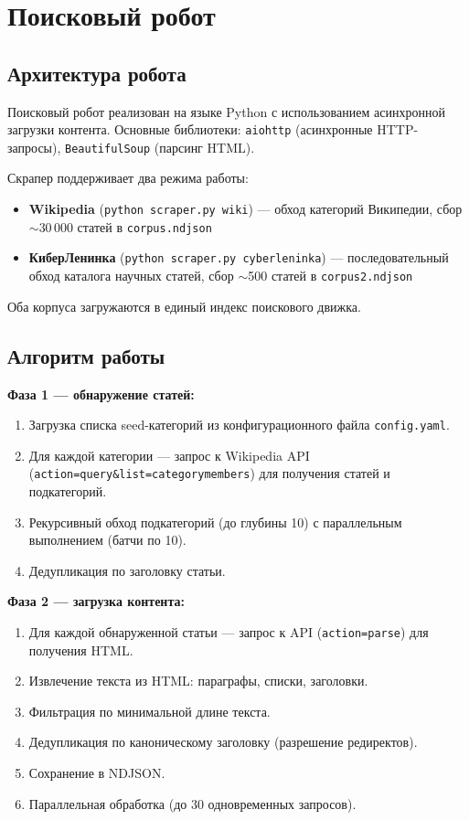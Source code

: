 \section{Поисковый робот}

\subsection{Архитектура робота}

Поисковый робот реализован на языке Python с использованием асинхронной загрузки контента. Основные библиотеки: \texttt{aiohttp} (асинхронные HTTP-запросы), \texttt{BeautifulSoup} (парсинг HTML).

Скрапер поддерживает два режима работы:
\begin{itemize}
    \item \textbf{Wikipedia} (\texttt{python scraper.py wiki}) --- обход категорий Википедии, сбор $\sim$30\,000 статей в \texttt{corpus.ndjson}
    \item \textbf{КиберЛенинка} (\texttt{python scraper.py cyberleninka}) --- последовательный обход каталога научных статей, сбор $\sim$500 статей в \texttt{corpus2.ndjson}
\end{itemize}

Оба корпуса загружаются в единый индекс поискового движка.

\subsection{Алгоритм работы}

\textbf{Фаза 1 --- обнаружение статей:}
\begin{enumerate}
    \item Загрузка списка seed-категорий из конфигурационного файла \texttt{config.yaml}.
    \item Для каждой категории --- запрос к Wikipedia API (\texttt{action=query\&list=categorymembers}) для получения статей и подкатегорий.
    \item Рекурсивный обход подкатегорий (до глубины 10) с параллельным выполнением (батчи по 10).
    \item Дедупликация по заголовку статьи.
\end{enumerate}

\textbf{Фаза 2 --- загрузка контента:}
\begin{enumerate}
    \item Для каждой обнаруженной статьи --- запрос к API (\texttt{action=parse}) для получения HTML.
    \item Извлечение текста из HTML: параграфы, списки, заголовки.
    \item Фильтрация по минимальной длине текста.
    \item Дедупликация по каноническому заголовку (разрешение редиректов).
    \item Сохранение в NDJSON.
    \item Параллельная обработка (до 30 одновременных запросов).
\end{enumerate}

